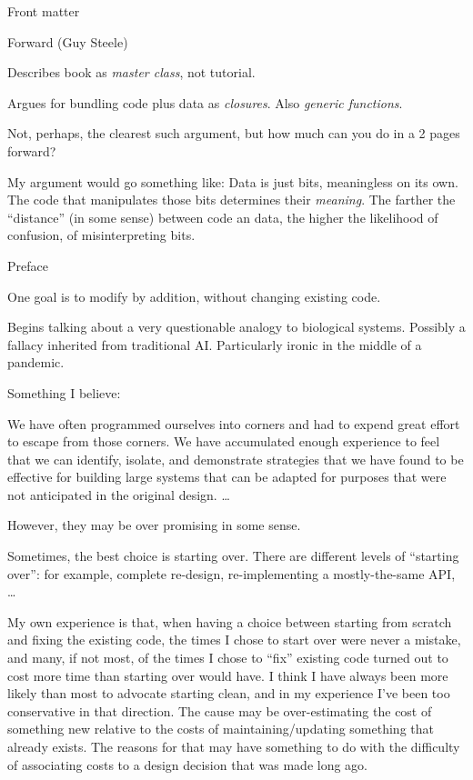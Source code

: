 \documentclass[12pt]{PalisadesLakesBook}
\begin{document}
\begin{plSection}{Front matter}
\begin{plSection}{Forward (Guy Steele)}

Describes book as \emph{master class}, not tutorial.

Argues for bundling code plus data as \emph{closures}. 
Also \emph{generic functions}.

Not, perhaps, the clearest such argument, but how much can you do
in a 2 pages forward?

My argument would go something like:
Data is just bits, meaningless on its own.
The code that manipulates those bits determines their 
\emph{meaning}.
The farther the ``distance'' (in some sense) 
between code an data, 
the higher the likelihood of confusion,
of misinterpreting bits. 

\end{plSection}%
\begin{plSection}{Preface}

One goal is to modify by addition, 
without changing existing code.

Begins talking about a very questionable analogy 
to biological systems.
Possibly a fallacy inherited from traditional AI.
Particularly ironic in the middle of a pandemic.

Something I believe:
\begin{plQuote}
{}{}
We have often programmed ourselves into corners
and had to expend great effort to escape from those corners.
We have accumulated enough experience to feel that we can
identify, isolate, and demonstrate strategies
that we have found to be effective for building large systems
that can be adapted for purposes 
that were not anticipated in the original design. {\ldots}
\end{plQuote}
However, they may be over promising in some sense.

Sometimes, the best choice is starting over.
There are different levels of ``starting over'':
for example, complete re-design, 
re-implementing a mostly-the-same API, {\ldots}

My own experience is that, when having a choice
between starting from scratch and fixing the existing code,
the times I chose to start over were never a mistake,
and many, if not most, of the times I chose to ``fix'' existing
code turned out to cost more time than starting over would have.
I think I have always been more likely than most 
                to advocate starting clean,
and in my experience I've been too conservative in that direction.
The cause may be over-estimating the cost of something new
relative to the costs of maintaining/updating something that
already exists. The reasons for that may have something to do
with the difficulty of associating costs to a design decision
that was made long ago.


\end{plSection}
\end{plSection}
\end{document}
